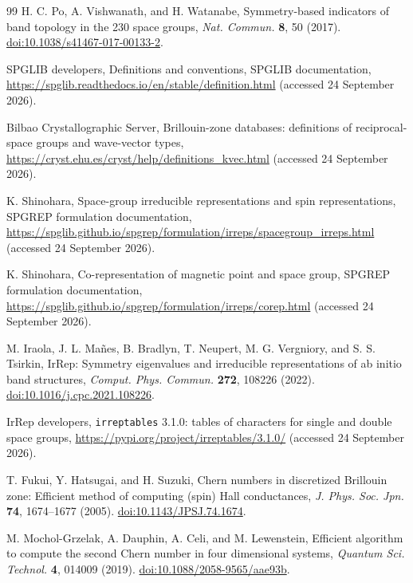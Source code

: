 \begin{thebibliography}{99}
H. C. Po, A. Vishwanath, and H. Watanabe, Symmetry-based indicators of
band topology in the 230 space groups,
\emph{Nat. Commun.} \textbf{8}, 50 (2017).
\href{https://doi.org/10.1038/s41467-017-00133-2}{doi:10.1038/s41467-017-00133-2}.

SPGLIB developers, Definitions and conventions, SPGLIB documentation,
\url{https://spglib.readthedocs.io/en/stable/definition.html}
(accessed 24 September 2026).

Bilbao Crystallographic Server, Brillouin-zone databases: definitions
of reciprocal-space groups and wave-vector types,
\url{https://cryst.ehu.es/cryst/help/definitions_kvec.html}
(accessed 24 September 2026).

K. Shinohara, Space-group irreducible representations and spin representations,
SPGREP formulation documentation,
\url{https://spglib.github.io/spgrep/formulation/irreps/spacegroup_irreps.html}
(accessed 24 September 2026).

K. Shinohara, Co-representation of magnetic point and space group,
SPGREP formulation documentation,
\url{https://spglib.github.io/spgrep/formulation/irreps/corep.html}
(accessed 24 September 2026).

M. Iraola, J. L. Ma\~nes, B. Bradlyn, T. Neupert, M. G. Vergniory,
and S. S. Tsirkin, IrRep: Symmetry eigenvalues and irreducible
representations of ab initio band structures,
\emph{Comput. Phys. Commun.} \textbf{272}, 108226 (2022).
\href{https://doi.org/10.1016/j.cpc.2021.108226}{doi:10.1016/j.cpc.2021.108226}.

IrRep developers, \texttt{irreptables} 3.1.0: tables of characters
for single and double space groups,
\url{https://pypi.org/project/irreptables/3.1.0/}
(accessed 24 September 2026).

T. Fukui, Y. Hatsugai, and H. Suzuki, Chern numbers in discretized Brillouin
zone: Efficient method of computing (spin) Hall conductances,
\emph{J. Phys. Soc. Jpn.} \textbf{74}, 1674--1677 (2005).
\href{https://doi.org/10.1143/JPSJ.74.1674}{doi:10.1143/JPSJ.74.1674}.

M. Mochol-Grzelak, A. Dauphin, A. Celi, and M. Lewenstein, Efficient
algorithm to compute the second Chern number in four dimensional systems,
\emph{Quantum Sci. Technol.} \textbf{4}, 014009 (2019).
\href{https://doi.org/10.1088/2058-9565/aae93b}{doi:10.1088/2058-9565/aae93b}.


\end{thebibliography}
